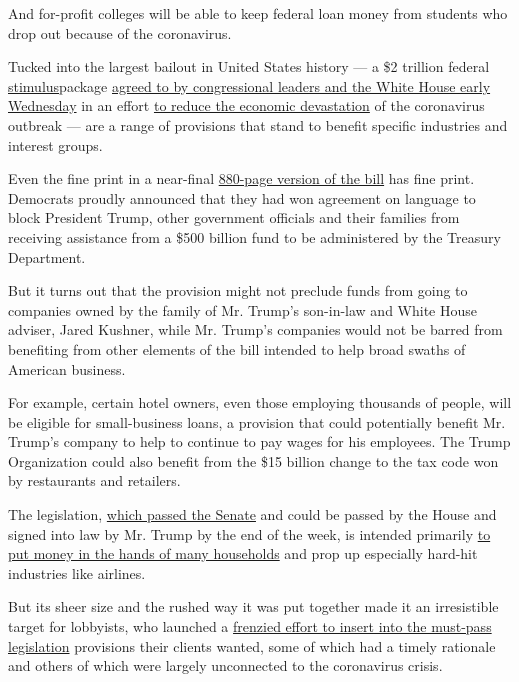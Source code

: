 And for-profit colleges will be able to keep federal loan money from
students who drop out because of the coronavirus.

Tucked into the largest bailout in United States history --- a \$2
trillion federal
\href{https://www.nytimes.com/article/where-is-my-stimulus-payment.html}{stimulus}package
\href{https://www.nytimes.com/2020/03/25/us/politics/coronavirus-senate-deal.html}{agreed
to by congressional leaders and the White House early Wednesday} in an
effort
\href{https://www.nytimes.com/2020/03/25/business/2-trillion-stimulus-coronavirus-bill.html}{to
reduce the economic devastation} of the coronavirus outbreak --- are a
range of provisions that stand to benefit specific industries and
interest groups.

Even the fine print in a near-final
\href{https://int.nyt.com/data/documenthelper/6843-revised-final-cares-10-p-m-3-2/ae6f534c4fc474f4ba33/optimized/full.pdf\#page=1}{880-page
version of the bill} has fine print. Democrats proudly announced that
they had won agreement on language to block President Trump, other
government officials and their families from receiving assistance from a
\$500 billion fund to be administered by the Treasury Department.

But it turns out that the provision might not preclude funds from going
to companies owned by the family of Mr. Trump's son-in-law and White
House adviser, Jared Kushner, while Mr. Trump's companies would not be
barred from benefiting from other elements of the bill intended to help
broad swaths of American business.

For example, certain hotel owners, even those employing thousands of
people, will be eligible for small-business loans, a provision that
could potentially benefit Mr. Trump's company to help to continue to pay
wages for his employees. The Trump Organization could also benefit from
the \$15 billion change to the tax code won by restaurants and
retailers.

The legislation,
\href{https://www.nytimes.com/2020/03/25/us/politics/coronavirus-senate-deal.html}{which
passed the Senate} and could be passed by the House and signed into law
by Mr. Trump by the end of the week, is intended primarily
\href{https://www.nytimes.com/2020/03/25/us/politics/whats-in-coronavirus-stimulus-bill.html}{to
put money in the hands of many households} and prop up especially
hard-hit industries like airlines.

But its sheer size and the rushed way it was put together made it an
irresistible target for lobbyists, who launched a
\href{https://www.nytimes.com/2020/03/20/us/politics/coronavirus-stimulus-lobbying.html}{frenzied
effort to insert into the must-pass legislation} provisions their
clients wanted, some of which had a timely rationale and others of which
were largely unconnected to the coronavirus crisis.


